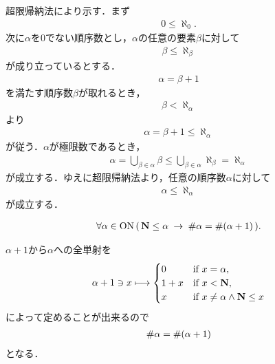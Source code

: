 	\begin{sketch}
		超限帰納法により示す．まず
		\begin{align}
			0 \leq \aleph_{0}.
		\end{align}
		次に$\alpha$を$0$でない順序数とし，$\alpha$の任意の要素$\beta$に対して
		\begin{align}
			\beta \leq \aleph_{\beta}
		\end{align}
		が成り立っているとする．
		\begin{align}
			\alpha = \beta + 1
		\end{align}
		を満たす順序数$\beta$が取れるとき，
		\begin{align}
			\beta < \aleph_{\alpha}
		\end{align}
		より
		\begin{align}
			\alpha = \beta + 1 \leq \aleph_{\alpha}
		\end{align}
		が従う．$\alpha$が極限数であるとき，
		\begin{align}
			\alpha = \bigcup_{\beta \in \alpha} \beta
			\leq \bigcup_{\beta \in \alpha} \aleph_{\beta}
			= \aleph_{\alpha}
		\end{align}
		が成立する．ゆえに超限帰納法より，任意の順序数$\alpha$に対して
		\begin{align}
			\alpha \leq \aleph_{\alpha}
		\end{align}
		が成立する．
		\QED
	\end{sketch}
	
	\begin{screen}
		\begin{thm}[無限順序数は後続数と濃度が等しい]
			\begin{align}
				\forall \alpha \in \mathrm{ON}\, (\,
				\mathbf{N} \leq \alpha \hspace{0.25em}\rightarrow\hspace{0.25em} \# \alpha = \# (\alpha + 1)\, ).
			\end{align}
		\end{thm}
	\end{screen}
	
	\begin{sketch}
		$\alpha + 1$から$\alpha$への全単射を
		\begin{align}
			\alpha + 1 \ni x \longmapsto
			\begin{cases}
				0 & \mbox{if } x = \alpha, \\
				1 + x & \mbox{if } x < \mathbf{N}, \\
				x & \mbox{if } x \neq \alpha \wedge \mathbf{N} \leq x
			\end{cases}
		\end{align}
		によって定めることが出来るので
		\begin{align}
			\# \alpha = \# (\alpha + 1)
		\end{align}
		となる．
		\QED
	\end{sketch}
	
